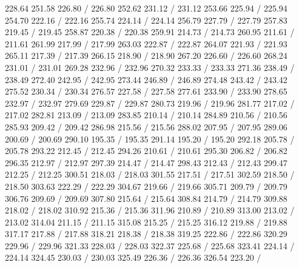 { 228.64 251.58 226.80 /
 226.80 252.62 231.12 /
 231.12 253.66 225.94 /
 225.94 254.70 222.16 /
 222.16 255.74 224.14 /
 224.14 256.79 227.79 /
 227.79 257.83 219.45 /
 219.45 258.87 220.38 /
 220.38 259.91 214.73 /
 214.73 260.95 211.61 /
 211.61 261.99 217.99 /
 217.99 263.03 222.87 /
 222.87 264.07 221.93 /
 221.93 265.11 217.39 /
 217.39 266.15 218.90 /
 218.90 267.20 226.60 /
 226.60 268.24 231.01 /
 231.01 269.28 232.96 /
 232.96 270.32 233.33 /
 233.33 271.36 238.49 /
 238.49 272.40 242.95 /
 242.95 273.44 246.89 /
 246.89 274.48 243.42 /
 243.42 275.52 230.34 /
 230.34 276.57 227.58 /
 227.58 277.61 233.90 /
 233.90 278.65 232.97 /
 232.97 279.69 229.87 /
 229.87 280.73 219.96 /
 219.96 281.77 217.02 /
 217.02 282.81 213.09 /
 213.09 283.85 210.14 /
 210.14 284.89 210.56 /
 210.56 285.93 209.42 /
 209.42 286.98 215.56 /
 215.56 288.02 207.95 /
 207.95 289.06 200.69 /
 200.69 290.10 195.35 /
 195.35 291.14 195.20 /
 195.20 292.18 205.78 /
 205.78 293.22 212.45 /
 212.45 294.26 210.61 /
 210.61 295.30 206.82 /
 206.82 296.35 212.97 /
 212.97 297.39 214.47 /
 214.47 298.43 212.43 /
 212.43 299.47 212.25 /
 212.25 300.51 218.03 /
 218.03 301.55 217.51 /
 217.51 302.59 218.50 /
 218.50 303.63 222.29 /
 222.29 304.67 219.66 /
 219.66 305.71 209.79 /
 209.79 306.76 209.69 /
 209.69 307.80 215.64 /
 215.64 308.84 214.79 /
 214.79 309.88 218.02 /
 218.02 310.92 215.36 /
 215.36 311.96 210.89 /
 210.89 313.00 213.02 /
 213.02 314.04 211.15 /
 211.15 315.08 215.25 /
 215.25 316.12 219.88 /
 219.88 317.17 217.88 /
 217.88 318.21 218.38 /
 218.38 319.25 222.86 /
 222.86 320.29 229.96 /
 229.96 321.33 228.03 /
 228.03 322.37 225.68 /
 225.68 323.41 224.14 /
 224.14 324.45 230.03 /
 230.03 325.49 226.36 /
 226.36 326.54 223.20 /
}
